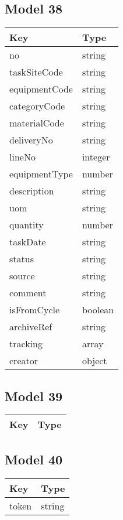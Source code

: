 \documentclass[10pt]{article}
\begin{document}
            \subsection{Model 38}
            
            \begin{tabularx}{\textwidth}{lZ}
                \textbf{Key} & \textbf{Type} \\
                \hline
                    no & string \\
                    taskSiteCode & string \\
                    equipmentCode & string \\
                    categoryCode & string \\
                    materialCode & string \\
                    deliveryNo & string \\
                    lineNo & integer \\
                    equipmentType & number \\
                    description & string \\
                    uom & string \\
                    quantity & number \\
                    taskDate & string \\
                    status & string \\
                    source & string \\
                    comment & string \\
                    isFromCycle & boolean \\
                    archiveRef & string \\
                    tracking & array \\
                    creator & object \\
            \end{tabularx}
            \subsection{Model 39}
            
            \begin{tabularx}{\textwidth}{lZ}
                \textbf{Key} & \textbf{Type} \\
                \hline
            \end{tabularx}
            \subsection{Model 40}
            
            \begin{tabularx}{\textwidth}{lZ}
                \textbf{Key} & \textbf{Type} \\
                \hline
                    token & string \\
            \end{tabularx}
        
\end{document}
